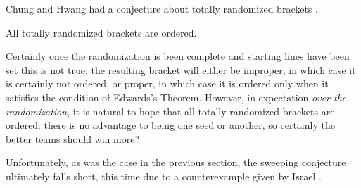 {    Chung and Hwang had a conjecture about totally randomized brackets \cite{define_ordered}.
    
    \begin{conj}{}{}
        All totally randomized brackets are ordered.
    \end{conj}

    Certainly once the randomization is been complete and starting lines have been set this is not true: the resulting bracket will either be improper, in which case it is certainly not ordered, or proper, in which case it is ordered only when it satisfies the condition of Edwards's Theorem. However, in expectation \textit{over the randomization}, it is natural to hope that all totally randomized brackets are ordered: there is no advantage to being one seed or another, so certainly the better teams should win more?

    Unfortunately, as was the case in the previous section, the sweeping conjecture ultimately falls short, this time due to a counterexample given by Israel \cite{seventeen_team}.

    }
